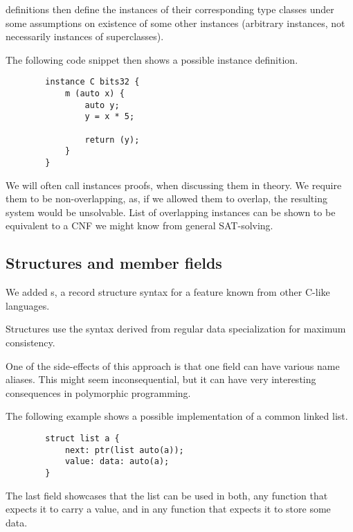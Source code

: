  definitions then define the instances of their corresponding type classes under some assumptions on existence of some other instances (arbitrary instances, not necessarily instances of superclasses).

\begin{ex}[Instance]
    The following code snippet then shows a possible instance definition.

    \begin{lstlisting}
        instance C bits32 {
            m (auto x) {
                auto y;
                y = x * 5;

                return (y);
            }
        }
    \end{lstlisting}
\end{ex}

We will often call instances proofs, when discussing them in theory. We require them to be non-overlapping, as, if we allowed them to overlap, the resulting system would be unsolvable. List of overlapping instances can be shown to be equivalent to a CNF we might know from general SAT-solving.

\subsection{Structures and member fields}

We added s, a record structure syntax for a feature known from other C-like languages.

Structures use the syntax derived from regular data specialization for maximum consistency.

One of the side-effects of this approach is that one field can have various name aliases. This might seem inconsequential, but it can have very interesting consequences in polymorphic programming.

\begin{ex}
    \label{list_ex}
    The following example shows a possible implementation of a common linked list.

    \begin{lstlisting}
        struct list a {
            next: ptr(list auto(a));
            value: data: auto(a);
        }
    \end{lstlisting}

    The last field showcases that the list can be used in both, any function that expects it to carry a value, and in any function that expects it to store some data.
\end{ex}

